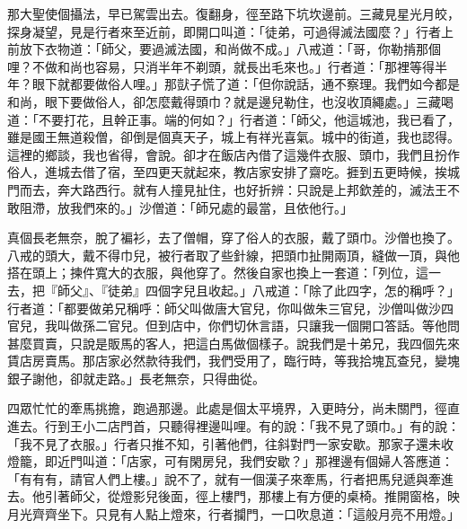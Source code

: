 那大聖使個攝法，早已駕雲出去。復翻身，徑至路下坑坎邊前。三藏見星光月皎，探身凝望，見是行者來至近前，即開口叫道：「徒弟，可過得滅法國麼？」行者上前放下衣物道：「師父，要過滅法國，和尚做不成。」八戒道：「哥，你勒掯那個哩？不做和尚也容易，只消半年不剃頭，就長出毛來也。」行者道：「那裡等得半年？眼下就都要做俗人哩。」那獃子慌了道：「但你說話，通不察理。我們如今都是和尚，眼下要做俗人，卻怎麼戴得頭巾？就是邊兒勒住，也沒收頂繩處。」三藏喝道：「不要打花，且幹正事。端的何如？」行者道：「師父，他這城池，我已看了，雖是國王無道殺僧，卻倒是個真天子，城上有祥光喜氣。城中的街道，我也認得。這裡的鄉談，我也省得，會說。卻才在飯店內借了這幾件衣服、頭巾，我們且扮作俗人，進城去借了宿，至四更天就起來，教店家安排了齋吃。捱到五更時候，挨城門而去，奔大路西行。就有人撞見扯住，也好折辨：只說是上邦欽差的，滅法王不敢阻滯，放我們來的。」沙僧道：「師兄處的最當，且依他行。」

真個長老無奈，脫了褊衫，去了僧帽，穿了俗人的衣服，戴了頭巾。沙僧也換了。八戒的頭大，戴不得巾兒，被行者取了些針線，把頭巾扯開兩頂，縫做一頂，與他搭在頭上；揀件寬大的衣服，與他穿了。然後自家也換上一套道：「列位，這一去，把『師父』、『徒弟』四個字兒且收起。」八戒道：「除了此四字，怎的稱呼？」行者道：「都要做弟兄稱呼：師父叫做唐大官兒，你叫做朱三官兒，沙僧叫做沙四官兒，我叫做孫二官兒。但到店中，你們切休言語，只讓我一個開口答話。等他問甚麼買賣，只說是販馬的客人，把這白馬做個樣子。說我們是十弟兄，我四個先來賃店房賣馬。那店家必然款待我們，我們受用了，臨行時，等我拾塊瓦查兒，變塊銀子謝他，卻就走路。」長老無奈，只得曲從。

四眾忙忙的牽馬挑擔，跑過那邊。此處是個太平境界，入更時分，尚未關門，徑直進去。行到王小二店門首，只聽得裡邊叫哩。有的說：「我不見了頭巾。」有的說：「我不見了衣服。」行者只推不知，引著他們，往斜對門一家安歇。那家子還未收燈籠，即近門叫道：「店家，可有閑房兒，我們安歇？」那裡邊有個婦人答應道：「有有有，請官人們上樓。」說不了，就有一個漢子來牽馬，行者把馬兒遞與牽進去。他引著師父，從燈影兒後面，徑上樓門，那樓上有方便的桌椅。推開窗格，映月光齊齊坐下。只見有人點上燈來，行者攔門，一口吹息道：「這般月亮不用燈。」

